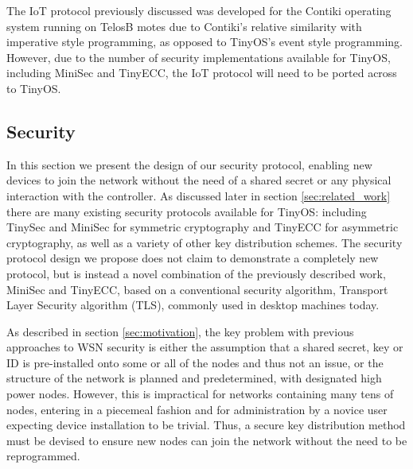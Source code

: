 \documentclass[conference]{./sty/IEEEtran}
\begin{document}
The IoT protocol previously discussed was developed for the Contiki operating system running on TelosB motes due to Contiki's relative similarity with imperative style programming, as opposed to TinyOS's event style programming. However, due to the number of security implementations available for TinyOS, including MiniSec and TinyECC, the IoT protocol will need to be ported across to TinyOS. 

\subsection{Security} %
\label{sub:security}
In this section we present the design of our security protocol, enabling new devices to join the network without the need of a shared secret or any physical interaction with the controller.
As discussed later in section \ref{sec:related_work} there are many existing security protocols available for TinyOS: including TinySec\cite{TinySec} and MiniSec\cite{MiniSec} for symmetric cryptography and TinyECC\cite{TinyECC} for asymmetric cryptography, as well as a variety of other key distribution schemes\cite{TinyPK,TinyPBC,Shi2013235,ContikiSec,MessageBottle,CertificatePairwise,MizanurRahman2010858}. The security protocol design we propose does not claim to demonstrate a completely new protocol, but is instead a novel combination of the previously described work, MiniSec and TinyECC, based on a conventional security algorithm, Transport Layer Security algorithm (TLS), commonly used in desktop machines today.

As described in section \ref{sec:motivation}, the key problem with previous approaches to WSN security is either the assumption that a shared secret, key or ID is pre-installed onto some or all of the nodes and thus not an issue, or the structure of the network is planned and predetermined, with designated high power nodes. However, this is impractical for networks containing many tens of nodes, entering in a piecemeal fashion and for administration by a novice user expecting device installation to be trivial. Thus, a secure key distribution method must be devised to ensure new nodes can join the network without the need to be reprogrammed.
\end{document}
